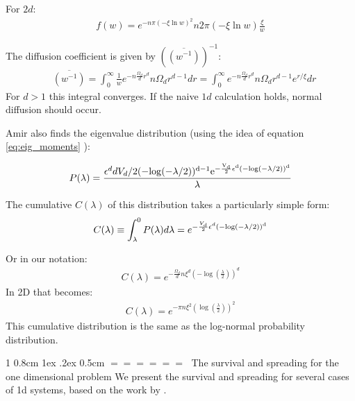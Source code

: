 \documentclass[onecolumn,fleqn,notitlepage,secnumarabic]{revtex4}
\makeatletter
\newenvironment{fminipage}%
  {\begin{Sbox}\begin{minipage}}%
  {\end{minipage}\end{Sbox}\fbox{\TheSbox}}
\def\section{%
  \@startsection
    {section}%
    {1}%
    {\z@}%
    {0.8cm \@plus1ex \@minus .2ex}%
    {0.5cm}%
    {\Large\bf $=\!=\!=\!=\!=\!=\;$}%
}%
\makeatother
\begin{document}
For $2d$:
\begin{align} f(w) = e^{-n \pi (-\xi\ln w)^2} n 2\pi  (-\xi\ln w)\frac{\xi}{w}\end{align}

The diffusion coefficient is given by $\left(\overline{(w^{-1})}\right)^{-1}$:
\begin{align}
    & \overline{(w^{-1})} = \int_0^\infty \frac{1}{w} e^{-n \frac{\Omega_d}{d} r^d} n\Omega_d r^{d-1} dr = \int_0^\infty e^{-n \frac{\Omega_d}{d} r^d} n\Omega_d r^{d-1}e^{r/\xi} dr 
\end{align}
For $d>1$ this integral converges. If the naive $1d$ calculation holds, normal diffusion should occur.

Amir also finds the eigenvalue distribution (using the idea of equation \eqref{eq:eig_moments} ):

\begin{fminipage}{\textwidth}
\begin{align} P(\lambda)=  \frac{\epsilon^d d V_d /2
(-\rm{log}(-\lambda/2))^{d-1} e^{-\frac{V_d}{2} \epsilon^d
(-\rm{log}(-\lambda/2))^d}}{\lambda} \end{align}


The cumulative $C(\lambda)$ of this distribution takes a
particularly simple form: 
\begin{align} C(\lambda)\equiv \int_\lambda^0
P(\lambda)d\lambda= e^{-\frac{V_d}{2} \epsilon^d
(-\rm{log}(-\lambda/2))^d} \end{align}
\end{fminipage}
Or in our notation:
\begin{align} C(\lambda)= e^{-\frac{\Omega_d}{d} n\xi^d \left( -\log(\frac{\lambda}{2})\right)^d}  \end{align}
In 2D that becomes:
\begin{align} C(\lambda) = e^{-\pi n\xi^2 \left(\log(\frac{\lambda}{2})\right)^2 } \end{align}
This cumulative distribution is the same as the log-normal probability distribution. 

\section{The survival and spreading for the one dimensional problem}\label{sec:alexander}
We present the survival and spreading for several cases of 1d systems, based on the work by \textcite{Alexander:1981:RMP}.
\end{document}
